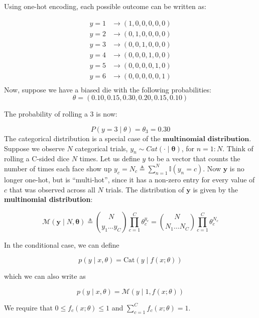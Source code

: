 \documentclass[10pt,landscape]{article}
\newcommand{\parameter}{\boldsymbol{\theta}}
\begin{document}
\begin{multicols*}{3}
Using one-hot encoding, each possible outcome can be written as:

\[
\begin{aligned}
y = 1 &\rightarrow (1,0,0,0,0,0) \\
y = 2 &\rightarrow (0,1,0,0,0,0) \\
y = 3 &\rightarrow (0,0,1,0,0,0) \\
y = 4 &\rightarrow (0,0,0,1,0,0) \\
y = 5 &\rightarrow (0,0,0,0,1,0) \\
y = 6 &\rightarrow (0,0,0,0,0,1) \\
\end{aligned}
\]
Now, suppose we have a biased die with the following probabilities:
\[
\theta = (0.10, 0.15, 0.30, 0.20, 0.15, 0.10)
\]

The probability of rolling a 3 is now:

\[
P(y = 3 \mid \theta) = \theta_3 = 0.30
\]
The categorical distribution is a special case of the $\textbf{multinomial distribution}$. Suppose we observe $N$ categorical trials, $y_n \sim Cat(\cdot\mid\parameter)$, for $n = 1 : N$. Think of rolling a C-sided dice $N$ times. Let us define $y$ to be a vector that counts the number of times each face show up
\( y_c = N_c \triangleq \sum_{n=1}^{N} \mathbb{I} (y_n = c) \). Now \( \mathbf{y} \) is no longer one-hot, but is ``multi-hot'', since it has a non-zero entry for every value of \( c \) that was observed across all \( N \) trials. The distribution of \( \mathbf{y} \) is given by the \textbf{multinomial distribution}:

\[
\mathcal{M}(\mathbf{y} \mid N, \parameter) \triangleq 
\binom{N}{y_1 \dots y_C} \prod_{c=1}^{C} \theta_c^{y_c} =
\binom{N}{N_1 \dots N_C} \prod_{c=1}^{C} \theta_c^{N_c}
\]


In the conditional case, we can define

\[
p(y \mid x, \theta) = \text{Cat}(y \mid f(x; \theta))
\]

which we can also write as

\[
p(y \mid x, \theta) = \mathcal{M}(y \mid 1, f(x; \theta))
\]

We require that \( 0 \leq f_c(x; \theta) \leq 1 \) and $
\sum_{c=1}^{C} f_c(x; \theta) = 1.$


\end{multicols*}
\end{document}

